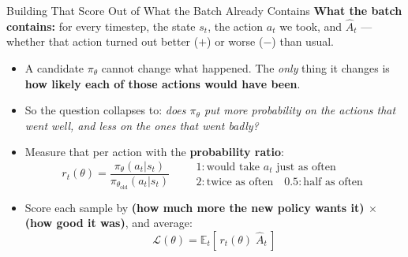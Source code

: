 \begin{frame}{Building That Score Out of What the Batch Already Contains}
\textbf{What the batch contains:} for every timestep, the state $s_t$, the action $a_t$ we took, and $\hat{A}_t$ --- whether that action turned out better ($+$) or worse ($-$) than usual.
\begin{itemize}
    \item A candidate $\pi_\theta$ cannot change what happened. The \emph{only} thing it changes is \textbf{how likely each of those actions would have been}.
    \pause
    \item So the question collapses to: \emph{does $\pi_\theta$ put more probability on the actions that went well, and less on the ones that went badly?}
    \pause
    \item Measure that per action with the \textbf{probability ratio}:\footnotemark
    $$r_t(\theta) = \frac{\pi_\theta(a_t|s_t)}{\pi_{\theta_\text{old}}(a_t|s_t)} \qquad
    \begin{array}{l} 1 : \text{would take } a_t \text{ just as often} \\ 2 : \text{twice as often} \quad 0.5 : \text{half as often} \end{array}$$
    \pause
    \item Score each sample by \textbf{(how much more the new policy wants it) $\times$ (how good it was)}, and average:
    $$\mathcal{L}(\theta) = \mathbb{E}_t\!\left[\, r_t(\theta)\; \hat{A}_t \,\right]$$
\end{itemize}
\end{frame}

